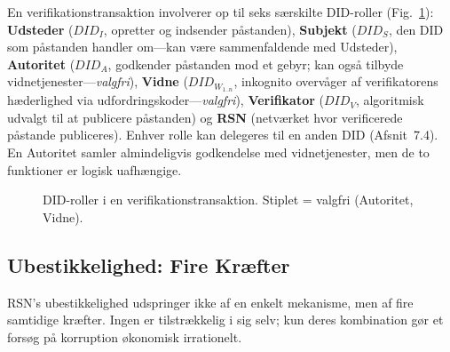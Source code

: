 \documentclass[11pt,a4paper,twocolumn]{article}
\begin{document}
En verifikationstransaktion involverer op til seks særskilte DID-roller (Fig.~\ref{fig:roles}): \textbf{Udsteder} ($DID_I$, opretter og indsender påstanden), \textbf{Subjekt} ($DID_S$, den DID som påstanden handler om---kan være sammenfaldende med Udsteder), \textbf{Autoritet} ($DID_A$, godkender påstanden mod et gebyr; kan også tilbyde vidnetjenester---\emph{valgfri}), \textbf{Vidne} ($DID_{W_{1..n}}$, inkognito overvåger af verifikatorens hæderlighed via udfordringskoder---\emph{valgfri}), \textbf{Verifikator} ($DID_V$, algoritmisk udvalgt til at publicere påstanden) og \textbf{RSN} (netværket hvor verificerede påstande publiceres). Enhver rolle kan delegeres til en anden DID (Afsnit~7.4). En Autoritet samler almindeligvis godkendelse med vidnetjenester, men de to funktioner er logisk uafhængige.

\begin{figure}[ht]
\centering
{}
\caption{DID-roller i en verifikationstransaktion. Stiplet = valgfri (Autoritet, Vidne).}
\label{fig:roles}
\end{figure}

\subsection{Ubestikkelighed: Fire Kræfter}

RSN's ubestikkelighed udspringer ikke af en enkelt mekanisme, men af fire samtidige kræfter. Ingen er tilstrækkelig i sig selv; kun deres kombination gør et forsøg på korruption økonomisk irrationelt.
\end{document}
